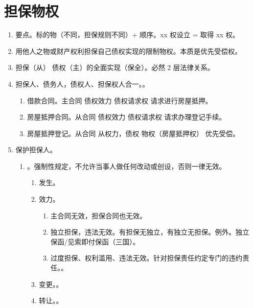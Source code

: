 \section{担保物权}
\begin{enumerate}
  \item 要点。标的物（不同，担保规则不同）+ 顺序。xx 权设立 = 取得 xx 权。
  \item 用他人之物或财产权利担保自己债权实现的限制物权。本质是优先受偿权。
  \item 担保（从） \yjt 债权（主）的全面实现（保全）。必然 2 层法律关系。
  \item 担保人、债务人，债权人、担保权人合一。。
        \begin{enumerate}
          \item 借款合同。主合同 \yjt 债权效力 \yjt 债权请求权 \yjt 请求进行房屋抵押。
          \item 房屋抵押合同。从合同 \yjt 债权效力 \yjt 债权请求权 \yjt 请求办理登记手续。
          \item 房屋抵押登记。从合同 \yjt 从权力，债权 \yjt 物权（房屋抵押权） \yjt 优先受偿。
        \end{enumerate}
  \item 保护担保人。
        \begin{enumerate}
          \item {}。强制性规定，不允许当事人做任何改动或创设，否则一律无效。
                \begin{enumerate}
                  \item 发生。
                  \item 效力。
                        \begin{enumerate}
                          \item 主合同无效，担保合同也无效。
                          \item 独立担保，违法无效。有担保无独立，有独立无担保。例外。独立保函/见索即付保函（三国）。
                          \item 过度担保、权利滥用、违法无效。针对担保责任约定专门的违约责任。。
                        \end{enumerate}
                  \item 变更。。
                  \item 转让。。

\end{enumerate}
\end{enumerate}
\end{enumerate}
